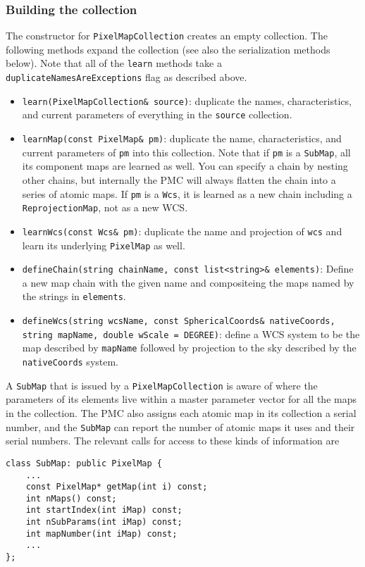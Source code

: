 \documentclass[11pt,preprint,flushrt]{aastex}
\begin{document}
\subsubsection{Building the collection}
The constructor for {\tt PixelMapCollection} creates an empty collection.  The following methods expand the collection (see also the serialization methods below).  Note that all of the {\tt learn} methods take a {\tt duplicateNamesAreExceptions} flag as described above.
\begin{itemize}
\item {\tt learn(PixelMapCollection\& source)}: duplicate the names, characteristics, and current parameters of everything in the {\tt source} collection.
\item {\tt learnMap(const PixelMap\& pm)}: duplicate the name, characteristics, and current parameters of {\tt pm} into this collection.  Note that if {\tt pm} is a {\tt SubMap}, all its component maps are learned as well. 
You can specify a chain by nesting other chains, but internally the PMC will always flatten the chain into a series of atomic maps.
 If {\tt pm} is a {\tt Wcs}, it is learned as a new chain including a {\tt ReprojectionMap}, not as a new WCS.
\item {\tt learnWcs(const Wcs\& pm)}: duplicate the name and projection of {\tt wcs} and learn its underlying {\tt PixelMap} as well. 
\item {\tt defineChain(string chainName, const list<string>\& elements)}: Define a new map chain with the given name and compositeing the maps named by the strings in {\tt elements}.
\item {\tt defineWcs(string wcsName, const SphericalCoords\& nativeCoords, string mapName,
		   double wScale = DEGREE)}: define a WCS system to be the map described by {\tt mapName} followed by projection to the sky described by the {\tt nativeCoords} system. 
               \end{itemize}

A {\tt SubMap} that is issued by a {\tt PixelMapCollection}
is aware of where the parameters of its elements live within a master parameter vector for all the maps in the collection.  The PMC also assigns each atomic map in its collection a serial number, and the \texttt{SubMap} can report the number of atomic maps it uses and their serial numbers.  The relevant calls for access to these kinds of information are
\begin{verbatim}
class SubMap: public PixelMap {
    ...
    const PixelMap* getMap(int i) const;
    int nMaps() const;
    int startIndex(int iMap) const;
    int nSubParams(int iMap) const;
    int mapNumber(int iMap) const;
    ...
};
\end{verbatim}
\end{document}
